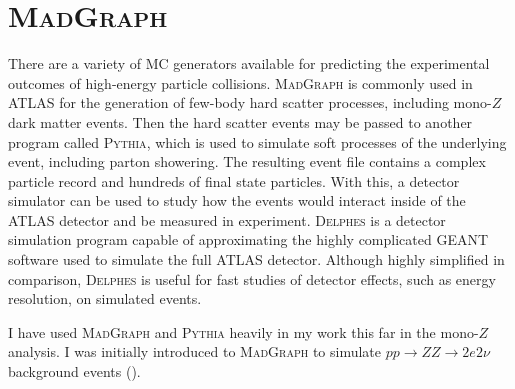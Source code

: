 \section{\textsc{MadGraph}}
\label{sec:mg}

There are a variety of MC generators available for predicting the experimental outcomes of high-energy particle collisions. \textsc{MadGraph} is commonly used in ATLAS for the generation of few-body hard scatter processes, including mono-$Z$ dark matter events. Then the hard scatter events may be passed to another program called \textsc{Pythia}, which is used to simulate soft processes of the underlying event, including parton showering. The resulting event file contains a complex particle record and hundreds of final state particles. With this, a detector simulator can be used to study how the events would interact inside of the ATLAS detector and be measured in experiment. \textsc{Delphes} is a detector simulation program capable of approximating the highly complicated GEANT software used to simulate the full ATLAS detector. Although highly simplified in comparison, \textsc{Delphes} is useful for fast studies of detector effects, such as energy resolution, on simulated events.

I have used \textsc{MadGraph} and \textsc{Pythia} heavily in my work this far in the mono-$Z$ analysis. I was initially introduced to \textsc{MadGraph} to simulate $pp \rightarrow ZZ \rightarrow 2e2\nu$ background events (\cite{sec:zzbackground}). 